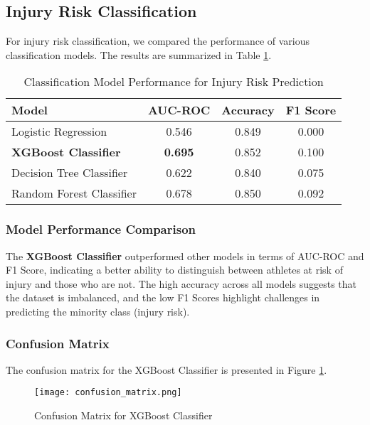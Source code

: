 \documentclass[manuscript,acmsmall,review,screen,authorversion=true]{acmart}
\begin{document}
\subsection{Injury Risk Classification}

For injury risk classification, we compared the performance of various classification models. The results are summarized in Table \ref{tab:classification_results}.

\begin{table}[h]
\caption{Classification Model Performance for Injury Risk Prediction}
\label{tab:classification_results}
\centering
\begin{tabular}{lccc}
\hline
\textbf{Model} & \textbf{AUC-ROC} & \textbf{Accuracy} & \textbf{F1 Score} \\
\hline
Logistic Regression & 0.546 & 0.849 & 0.000 \\
\textbf{XGBoost Classifier}  & \textbf{0.695} & 0.852 & 0.100 \\
Decision Tree Classifier & 0.622 & 0.840 & 0.075 \\
Random Forest Classifier & 0.678 & 0.850 & 0.092 \\
\hline
\end{tabular}
\end{table}

\subsubsection{Model Performance Comparison}

The \textbf{XGBoost Classifier} outperformed other models in terms of AUC-ROC and F1 Score, indicating a better ability to distinguish between athletes at risk of injury and those who are not. The high accuracy across all models suggests that the dataset is imbalanced, and the low F1 Scores highlight challenges in predicting the minority class (injury risk).

\subsubsection{Confusion Matrix}

The confusion matrix for the XGBoost Classifier is presented in Figure \ref{fig:confusion_matrix}.

\begin{figure}[h]
\centering
\texttt{[image: confusion\_matrix.png]} %
\caption{Confusion Matrix for XGBoost Classifier}
\label{fig:confusion_matrix}
\end{figure}
\end{document}
